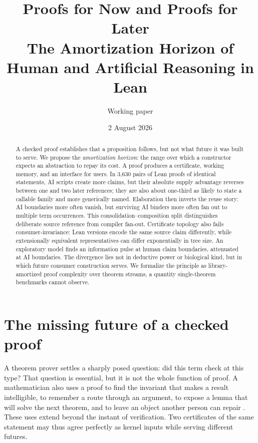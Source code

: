 \documentclass[10pt]{article}
\title{\textbf{Proofs for Now and Proofs for Later}\\
\large The Amortization Horizon of Human and Artificial Reasoning in Lean}
\author{Working paper}
\date{2 August 2026}
\begin{document}
\maketitle

\begin{abstract}
A checked proof establishes that a proposition follows, but not what future it was built to serve.
We propose the \emph{amortization horizon}: the range over which a
constructor expects an abstraction to repay its cost. A proof produces a certificate,
working memory, and an interface for users. In 3,630 pairs of Lean proofs of
identical statements, AI scripts create more claims, but their absolute supply advantage reverses
between one and two later references; they are also about one-third as likely to state a callable
family and more generically named. Elaboration then
inverts the reuse story: AI boundaries more often vanish, but surviving AI binders more
often fan out to multiple term occurrences. This consolidation--composition split distinguishes
deliberate source reference from compiler fan-out. Certificate topology also fails consumer-invariance: Lean versions encode the same
source claim differently, while extensionally equivalent representatives can differ exponentially
in tree size. An exploratory model finds an information pulse at human claim boundaries,
attenuated at AI boundaries. The divergence lies not in deductive power or biological kind, but in
which future consumer construction serves. We formalize the principle as library-amortized proof
complexity over theorem streams, a quantity single-theorem benchmarks cannot observe.
\end{abstract}

\section{The missing future of a checked proof}

A theorem prover settles a sharply posed question: did this term check at this type?  That question
is essential, but it is not the whole function of proof.  A mathematician also uses a proof to find
the invariant that makes a result intelligible, to remember a route through an argument, to expose
a lemma that will solve the next theorem, and to leave an object another person can repair
\citep{rav1999}.  These
uses extend beyond the instant of verification.  Two certificates of the same statement may thus
agree perfectly as kernel inputs while serving different futures.
\end{document}
